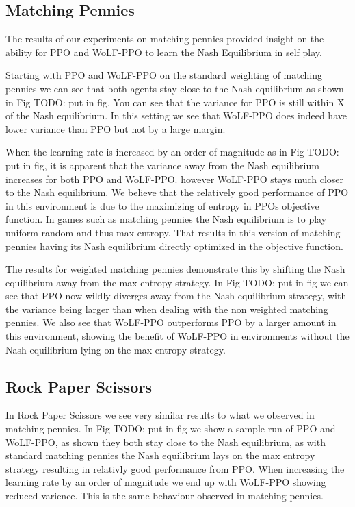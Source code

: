 \documentclass{article}
\newcommand\TODO[1]{{\color{red}TODO: #1}}
\begin{document}
\subsection{Matching Pennies}

The results of our experiments on matching pennies provided insight on the ability for PPO and WoLF-PPO to learn the Nash Equilibrium in self play.

Starting with PPO and WoLF-PPO on the standard weighting of matching pennies we can see that both agents stay close to the Nash equilibrium as shown in Fig \TODO{put in fig}. You can see that the variance for PPO is still within X of the Nash equilibrium. In this setting we see that WoLF-PPO does indeed have lower variance than PPO but not by a large margin.

When the learning rate is increased by an order of magnitude as in Fig \TODO{put in fig}, it is apparent that the variance away from the Nash equilibrium increases for both PPO and WoLF-PPO. however WoLF-PPO stays much closer to the Nash equilibrium. We believe that the relatively good performance of PPO in this environment is due to the maximizing of entropy in PPOs objective function. In games such as matching pennies the Nash equilibrium is to play uniform random and thus max entropy. That results in this version of matching pennies having its Nash equilibrium directly optimized in the objective function.

The results for weighted matching pennies demonstrate this by shifting the Nash equilibrium away from the max entropy strategy. In Fig \TODO{put in fig} we can see that PPO now wildly diverges away from the Nash equilibrium strategy, with the variance being larger than when dealing with the non weighted matching pennies. We also see that WoLF-PPO outperforms PPO by a larger amount in this environment, showing the benefit of WoLF-PPO in environments without the Nash equilibrium lying on the max entropy strategy.

\subsection{Rock Paper Scissors}

In Rock Paper Scissors we see very similar results to what we observed in matching pennies. In Fig \TODO{put in fig} we show a sample run of PPO and WoLF-PPO, as shown they both stay close to the Nash equilibrium, as with standard matching pennies the Nash equilibrium lays on the max entropy strategy resulting in relativly good performance from PPO. When increasing the learning rate by an order of magnitude we end up with WoLF-PPO showing reduced varience. This is the same behaviour observed in matching pennies.
\end{document}

